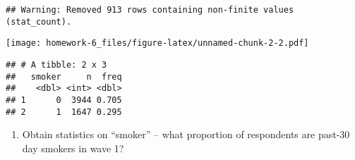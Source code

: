 \documentclass[]{article}
\newenvironment{Shaded}{\begin{snugshade}}{\end{snugshade}}
\newcommand{\CommentTok}[1]{\textcolor[rgb]{0.56,0.35,0.01}{\textit{#1}}}
\newcommand{\DataTypeTok}[1]{\textcolor[rgb]{0.13,0.29,0.53}{#1}}
\newcommand{\DecValTok}[1]{\textcolor[rgb]{0.00,0.00,0.81}{#1}}
\newcommand{\KeywordTok}[1]{\textcolor[rgb]{0.13,0.29,0.53}{\textbf{#1}}}
\newcommand{\NormalTok}[1]{#1}
\newcommand{\OperatorTok}[1]{\textcolor[rgb]{0.81,0.36,0.00}{\textbf{#1}}}
\newcommand{\StringTok}[1]{\textcolor[rgb]{0.31,0.60,0.02}{#1}}
\providecommand{\tightlist}{%
  \setlength{\itemsep}{0pt}\setlength{\parskip}{0pt}}
\begin{document}
\begin{Shaded}
\end{Shaded}

\begin{verbatim}
## Warning: Removed 913 rows containing non-finite values (stat_count).
\end{verbatim}

\texttt{[image: homework-6\_files/figure-latex/unnamed-chunk-2-2.pdf]}

\begin{Shaded}
\end{Shaded}

\begin{verbatim}
## # A tibble: 2 x 3
##   smoker     n  freq
##    <dbl> <int> <dbl>
## 1      0  3944 0.705
## 2      1  1647 0.295
\end{verbatim}

\begin{enumerate}
\def\labelenumi{\alph{enumi}.}
\setcounter{enumi}{1}
\tightlist
\item
  Obtain statistics on ``smoker'' -- what proportion of respondents are
  past-30 day smokers in wave 1?
\end{enumerate}
\end{document}
